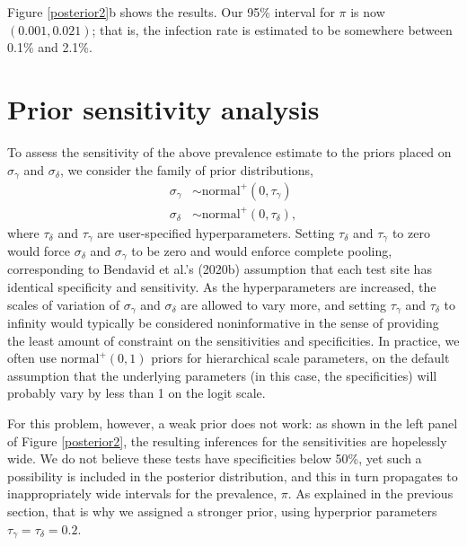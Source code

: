 \documentclass[11pt]{article}
\begin{document}
Figure \ref{posterior2}b shows the results.  Our 95\% interval for
$\pi$ is now $(0.001, 0.021)$; that is, the infection rate is
estimated to be somewhere between 0.1\% and 2.1\%.

\section{Prior sensitivity analysis}

To assess the sensitivity of the above prevalence estimate to the
priors placed on $\sigma_{\gamma}$ and $\sigma_{\delta}$, we consider
the family of prior distributions,
%
\begin{align*}
  \sigma_{\gamma} & \sim \mbox{normal}^+(0, \tau_{\gamma})\\
\sigma_{\delta} & \sim  \mbox{normal}^+(0, \tau_{\delta}),
\end{align*}
%
where $\tau_{\delta} $ and $\tau_{\gamma} $ are user-specified
hyperparameters. Setting $\tau_{\delta}$ and $\tau_{\gamma}$ to zero
would force $\sigma_{\delta}$ and $\sigma_{\gamma}$ to be zero and
would enforce complete pooling, corresponding to Bendavid et al.'s
(2020b) assumption that each test site has identical specificity and
sensitivity. As the hyperparameters are increased, the scales of
variation of $\sigma_{\gamma}$ and $\sigma_{\delta}$ are allowed to
vary more, and setting $\tau_{\gamma}$ and $\tau_{\delta}$ to infinity
would typically be considered noninformative in the sense of providing
the least amount of constraint on the sensitivities and specificities.
In practice, we often use $\mbox{normal}^+(0,1)$ priors for
hierarchical scale parameters, on the default assumption that the
underlying parameters (in this case, the specificities) will probably
vary by less than 1 on the logit scale.

For this problem, however, a weak prior does not work: as shown in the
left panel of Figure \ref{posterior2}, the resulting inferences for
the sensitivities are hopelessly wide. We do not believe these tests
have specificities below 50\%, yet such a possibility is included in
the posterior distribution, and this in turn propagates to
inappropriately wide intervals for the prevalence, $\pi$.  As
explained in the previous section, that is why we assigned a stronger
prior, using hyperprior parameters $\tau_{\gamma}=\tau_{\delta}=0.2$.
\end{document}
